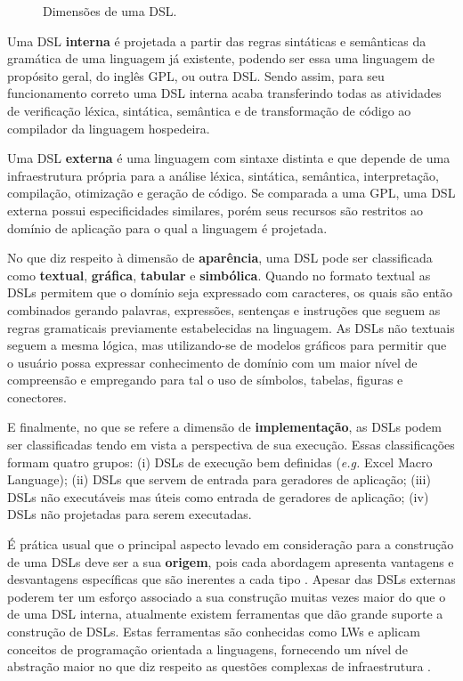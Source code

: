 \begin{figure}[!htb]
    \centering
    \caption{Dimensões de uma DSL.}
    
    \label{fig:ClassDSL}
\end{figure}
    
Uma \ac{DSL} \textbf{interna} é projetada a partir das regras sintáticas e semânticas da gramática de uma linguagem já existente, podendo ser essa uma linguagem de propósito geral, do inglês \ac{GPL}, ou outra \ac{DSL}. 
Sendo assim, para seu funcionamento correto uma \ac{DSL} interna acaba transferindo todas as atividades de verificação léxica, sintática, semântica e de transformação de código ao compilador da linguagem hospedeira.

Uma \ac{DSL} \textbf{externa} é uma linguagem com sintaxe distinta e que depende de uma infraestrutura própria para a análise léxica, sintática, semântica, interpretação, compilação, otimização e geração de código. 
Se comparada a uma \ac{GPL}, uma \ac{DSL} externa possui especificidades similares, porém seus recursos são restritos ao domínio de aplicação para o qual a linguagem é projetada.
    
No que diz respeito à dimensão de \textbf{aparência}, uma \ac{DSL} pode ser classificada como \textbf{textual}, \textbf{gráfica}, \textbf{tabular} e \textbf{simbólica}. 
Quando no formato textual as \acp{DSL} permitem que o domínio seja expressado com caracteres, os quais são então combinados gerando palavras, expressões, sentenças e instruções que seguem as regras gramaticais previamente estabelecidas na linguagem. 
As \acp{DSL} não textuais seguem a mesma lógica, mas utilizando-se de modelos gráficos para permitir que o usuário possa expressar conhecimento de domínio com um maior nível de compreensão e empregando para tal o uso de símbolos, tabelas, figuras e conectores. 
    
E finalmente, no que se refere a dimensão de \textbf{implementação}, as \acp{DSL} podem ser classificadas tendo em vista a perspectiva de sua execução. 
Essas classificações formam quatro grupos: 
(i) \acp{DSL} de execução bem definidas (\textit{e.g.} Excel Macro Language); 
(ii) \acp{DSL} que servem de entrada para geradores de aplicação; 
(iii) \acp{DSL} não executáveis mas úteis como entrada de geradores de aplicação; 
(iv) \acp{DSL} não projetadas para serem executadas.

É prática usual que o principal aspecto levado em consideração para a construção de uma \acp{DSL} deve ser a sua \textbf{origem}, pois cada abordagem apresenta vantagens e desvantagens específicas que são inerentes a cada tipo \cite{Fowler:2010}. 
Apesar das \acp{DSL} externas poderem ter um esforço associado a sua construção muitas vezes maior do que o de uma \ac{DSL} interna, atualmente existem ferramentas que dão grande suporte a construção de \acp{DSL}. 
Estas ferramentas são conhecidas como \acp{LW} e aplicam conceitos de programação orientada a linguagens, fornecendo um nível de abstração maior no que diz respeito as questões complexas de infraestrutura \cite{Fowler:2005}.
    
